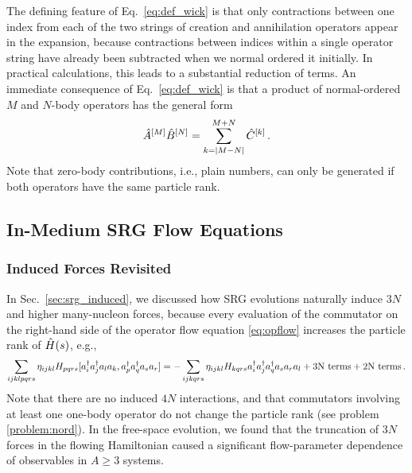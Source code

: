 The defining feature of Eq.~\eqref{eq:def_wick} is that only contractions 
between one index from each of the two strings of creation and annihilation
operators appear in the expansion, because contractions between indices 
within a single operator string have already been subtracted when we normal 
ordered it initially. In practical calculations, this leads to a substantial 
reduction of terms. An immediate consequence of Eq.~\eqref{eq:def_wick} is 
that a product of normal-ordered $M$ and $N$-body operators has the general 
form
\begin{equation}\label{eq:wick_product_schematic}
  \AO^{[M]}\BO^{[N]} = \sum_{k=|M-N|}^{M+N}\CO^{[k]}\,.
\end{equation}
Note that zero-body contributions, i.e., plain numbers, can only be generated 
if both operators have the same particle rank.

\subsection{\label{sec:imsrg_flow}In-Medium SRG Flow Equations}

%
%
\subsubsection{Induced Forces Revisited}
In Sec.~\ref{sec:srg_induced}, we discussed how SRG evolutions naturally
induce $3N$ and higher many-nucleon forces, because every evaluation of 
the commutator on the right-hand side of the operator flow equation 
\eqref{eq:opflow} increases the particle rank of $\hat{H}(s)$, e.g.,
\begin{equation}\label{eq:induced_3N}
  \sum_{ijklpqrs}\eta_{ijkl}H_{pqrs}\comm{\aaO_{i}\aaO_{j}\aO_{l}\aO_{k}}{\aaO_{p}\aaO_{q}\aO_{s}\aO_{r}}
    = -\sum_{ijkqrs}\eta_{ijkl}H_{kqrs} \aaO_{i}\aaO_{j}\aaO_{q}\aO_{s}\aO_{r}\aO_{l} + \text{3N terms} + \text{2N terms}\,.
\end{equation}
Note that there are no induced $4N$ interactions, and that commutators
involving at least one one-body operator do not change the particle rank
(see problem \ref{problem:nord}). In the free-space evolution, we 
found that the truncation of $3N$ forces in the flowing Hamiltonian caused
a significant flow-parameter dependence of observables in $A\geq 3$ systems.

